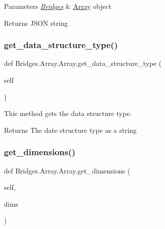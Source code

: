 \begin{DoxyParams}{Parameters}
{\em \mbox{\hyperlink{namespace_bridges_1_1_bridges}{Bridges}}} & \mbox{\hyperlink{class_bridges_1_1_array_1_1_array}{Array}} object\\
\hline
\end{DoxyParams}
\begin{DoxyReturn}{Returns}
J\+S\+ON string 
\end{DoxyReturn}
\mbox{\label{class_bridges_1_1_array_1_1_array_a214847a9e90416f2ae0e14a02aa6376f}} 
\subsubsection{\texorpdfstring{get\+\_\+data\+\_\+structure\+\_\+type()}{get\_data\_structure\_type()}}
{\footnotesize\ttfamily def Bridges.\+Array.\+Array.\+get\+\_\+data\+\_\+structure\+\_\+type (\begin{DoxyParamCaption}\item[{}]{self }\end{DoxyParamCaption})}



This method gets the data structure type. 

\begin{DoxyReturn}{Returns}
The date structure type as a string 
\end{DoxyReturn}
\mbox{\label{class_bridges_1_1_array_1_1_array_a7ad57c2bd46d18fbff99dd19cd88ba68}} 
\subsubsection{\texorpdfstring{get\+\_\+dimensions()}{get\_dimensions()}}
{\footnotesize\ttfamily def Bridges.\+Array.\+Array.\+get\+\_\+dimensions (\begin{DoxyParamCaption}\item[{}]{self,  }\item[{}]{dims }\end{DoxyParamCaption})}



